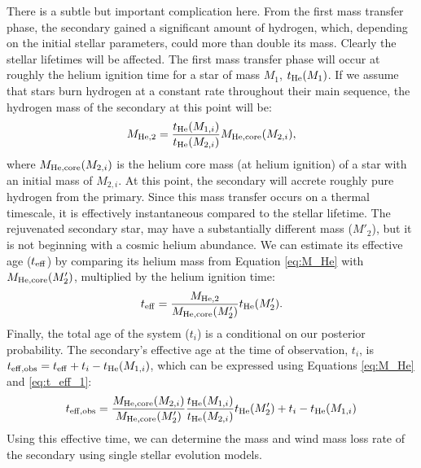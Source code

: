 \documentclass[12pt, preprint]{aastex}
\begin{document}



There is a subtle but important complication here. From the first mass transfer phase, the secondary gained a significant amount of hydrogen, which, depending on the initial stellar parameters, could more than double its mass. Clearly the stellar lifetimes will be affected. The first mass transfer phase will occur at roughly the helium ignition time for a star of mass $M_1$, $t_{\rm He} (M_1)$. If we assume that stars burn hydrogen at a constant rate throughout their main sequence, the hydrogen mass of the secondary at this point will be:
\begin{equation}
M_{\rm He,2} = \frac{t_{\rm He}(M_{1,i})}{t_{\rm He}(M_{2,i})} M_{\rm He,core}(M_{2,i}), \label{eq:M_He}
\end{equation}
where $M_{\rm He,core}(M_{2,i})$ is the helium core mass (at helium ignition) of a star with an initial mass of $M_{2,i}$. At this point, the secondary will accrete roughly pure hydrogen from the primary. Since this mass transfer occurs on a thermal timescale, it is effectively instantaneous compared to the stellar lifetime. The rejuvenated secondary star, may have a substantially different mass ($M'_2$), but it is not beginning with a cosmic helium abundance. We can estimate its effective age ($t_{\rm eff}$) by comparing its helium mass from Equation \ref{eq:M_He} with $M_{\rm He,core}(M_2')$, multiplied by the helium ignition time:
\begin{equation}
t_{\rm eff} = \frac{M_{\rm He,2}}{M_{\rm He,core} (M_2') } t_{\rm He} (M_2'). \label{eq:t_eff_1}
\end{equation}
Finally, the total age of the system ($t_i$) is a conditional on our posterior probability. The secondary's effective age at the time of observation, $t_i$, is $t_{\rm eff,obs} = t_{\rm eff} + t_i - t_{\rm He}(M_{1,i})$, which can be expressed using Equations \ref{eq:M_He} and \ref{eq:t_eff_1}:
\begin{equation}
t_{\rm eff,obs} = \frac{M_{\rm He,core}(M_{2,i})}{M_{\rm He,core}(M_2')} \frac{t_{\rm He}(M_{1,i})}{t_{\rm He}(M_{2,i})} t_{\rm He}(M_2')
  + t_i - t_{\rm He}(M_{1,i}) \label{eq:t_eff_obs_full}
\end{equation}
Using this effective time, we can determine the mass and wind mass loss rate of the secondary using single stellar evolution models.
\end{document}
